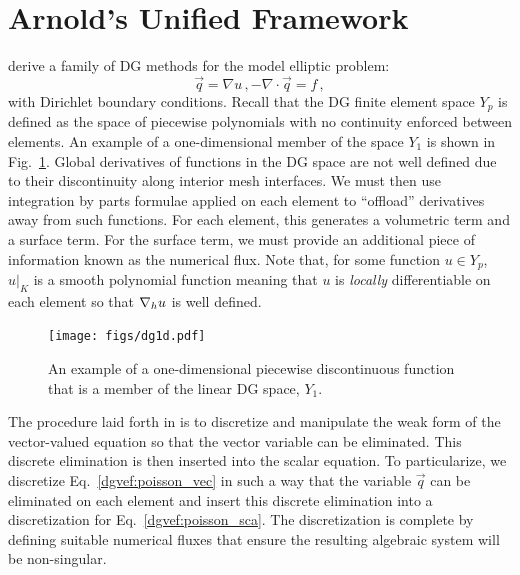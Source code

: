 \documentclass[../doc.tex]{subfiles}
\begin{document}
\section{Arnold's Unified Framework}
\textcite{Arnold2002} derive a family of DG methods for the model elliptic problem: 
	\begin{subequations}
	\begin{equation} \label{dgvef:poisson_vec}
		\vec{q} = \nabla u \,, 
	\end{equation}
	\begin{equation} \label{dgvef:poisson_sca}
		-\nabla\cdot\vec{q} = f\,,
	\end{equation}
	\end{subequations}
with Dirichlet boundary conditions. Recall that the DG finite element space $Y_p$ is defined as the space of piecewise polynomials with no continuity enforced between elements. An example of a one-dimensional member of the space $Y_1$ is shown in Fig.~\ref{dgvef:dg1d}. 
Global derivatives of functions in the DG space are not well defined due to their discontinuity along interior mesh interfaces.
We must then use integration by parts formulae applied on each element to ``offload'' derivatives away from such functions. For each element, this generates a volumetric term and a surface term. For the surface term, we must provide an additional piece of information known as the numerical flux.  
Note that, for some function $u\in Y_p$, $u|_K$ is a smooth polynomial function meaning that $u$ is \emph{locally} differentiable on each element so that $\nabla_h u$ is well defined. 
\begin{figure}
\centering
\texttt{[image: figs/dg1d.pdf]}
\caption{An example of a one-dimensional piecewise discontinuous function that is a member of the linear DG space, $Y_1$.}
\label{dgvef:dg1d}
\end{figure}

The procedure laid forth in \textcite{Arnold2002} is to discretize and manipulate the weak form of the vector-valued equation so that the vector variable can be eliminated. This discrete elimination is then inserted into the scalar equation. 
To particularize, we discretize Eq.~\ref{dgvef:poisson_vec} in such a way that the variable $\vec{q}$ can be eliminated on each element and insert this discrete elimination into a discretization for Eq.~\ref{dgvef:poisson_sca}. 
The discretization is complete by defining suitable numerical fluxes that ensure the resulting algebraic system will be non-singular. 
\end{document}
